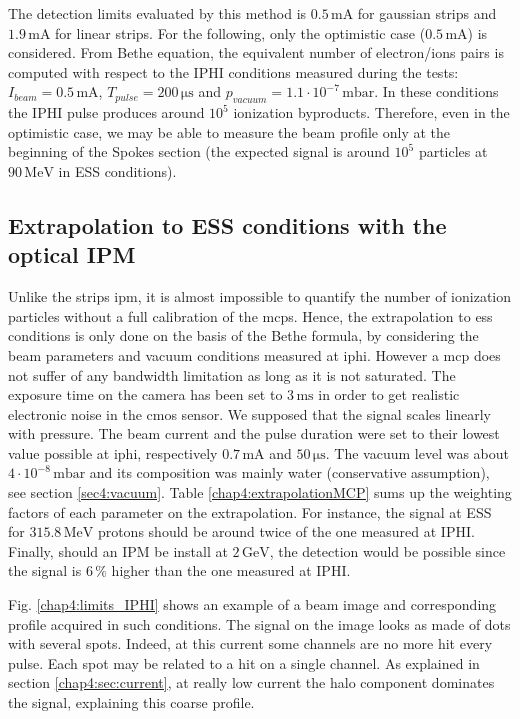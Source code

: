 \begin{refsection}
  The detection limits evaluated by this method is $0.5\,\mathrm{mA}$ for gaussian strips and $1.9\,\mathrm{mA}$ for linear strips. For the following, only the optimistic case ($0.5\,\mathrm{mA}$) is considered. From Bethe equation, the equivalent number of electron/ions pairs is computed with respect to the IPHI conditions measured during the tests: $I_{beam}=0.5\,\mathrm{mA}$, $T_{pulse}=200\,\mathrm{\mu s}$ and $p_{vacuum}=1.1 \cdot 10^{-7}\,\mathrm{mbar}$.
  In these conditions the IPHI pulse produces around $10^{5}$ ionization byproducts.
  Therefore, even in the optimistic case, we may be able to measure the beam profile only at the beginning of the Spokes section (the expected signal is around $10^{5}$ particles at $90\,\mathrm{MeV}$ in ESS conditions).

  \subsection{Extrapolation to ESS conditions with the optical IPM}
  \label{chap4:sec:MCPess}
  Unlike the strips \acrshort{ipm}, it is almost impossible to quantify the number of ionization particles without a full calibration of the \acrshort{mcp}s. Hence, the extrapolation to \acrshort{ess} conditions is only done on the basis of the Bethe formula, by considering the beam parameters and vacuum conditions measured at \acrshort{iphi}.
  However a \acrshort{mcp} does not suffer of any bandwidth limitation as long as it is not saturated. The exposure time on the camera has been set to $3\,\mathrm{ms}$ in order to get realistic electronic noise in the \acrshort{cmos} sensor.
  We supposed that the signal scales linearly with pressure. The beam current and the pulse duration were set to their lowest value possible at \acrshort{iphi}, respectively $0.7\,\mathrm{mA}$ and $50\,\mathrm{\mu s}$. The vacuum level was about $4 \cdot 10^{-8}\,\mathrm{mbar}$ and its composition was mainly water (conservative assumption), see section \ref{sec4:vacuum}. Table \ref{chap4:extrapolationMCP} sums up the weighting factors of each parameter on the extrapolation. For instance, the signal at ESS for $315.8\,\mathrm{MeV}$ protons should be around twice of the one measured at IPHI. Finally, should an IPM be install at $2\,\mathrm{GeV}$, the detection would be possible since the signal is $6\,\%$ higher than the one measured at IPHI.
  
  

  Fig. \ref{chap4:limits_IPHI} shows an example of a beam image and corresponding profile acquired in such conditions. The signal on the image looks as made of dots with several spots. Indeed, at this current some channels are no more hit every pulse. Each spot may be related to a hit on a single channel. As explained in section \ref{chap4:sec:current}, at really low current the halo component dominates the signal, explaining this coarse profile.


\end{refsection}
